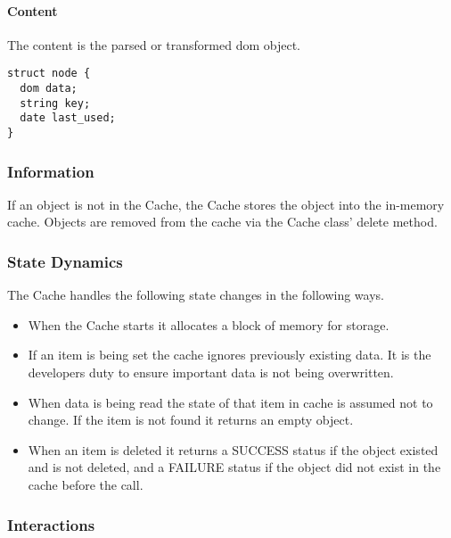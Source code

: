 \paragraph{Content}
The content is the parsed or transformed \gls{dom} object.

\begin{lstlisting}
struct node {
  dom data;
  string key;
  date last_used;
}
\end{lstlisting}

\subsubsection{Information}

If an object is not in the Cache, the Cache stores the object into the in-memory cache. 
Objects are removed from the cache via the Cache class' delete method.

\subsubsection{State Dynamics}

The Cache handles the following state changes in the following ways.

\begin{itemize}
    \item {
      When the Cache starts it allocates a block of memory for storage.
     }
    \item {
      If an item is being set the cache ignores previously existing data.
      It is the developers duty to ensure important data is not being overwritten.
    }
    \item {
      When data is being read the state of that item in cache is assumed not to change.
      If the item is not found it returns an empty object.
    }
    \item  When an item is deleted it returns a SUCCESS status if the object existed and is not deleted, and a FAILURE status if the object did not exist in the cache before the call.
\end{itemize}

\subsubsection{Interactions}

